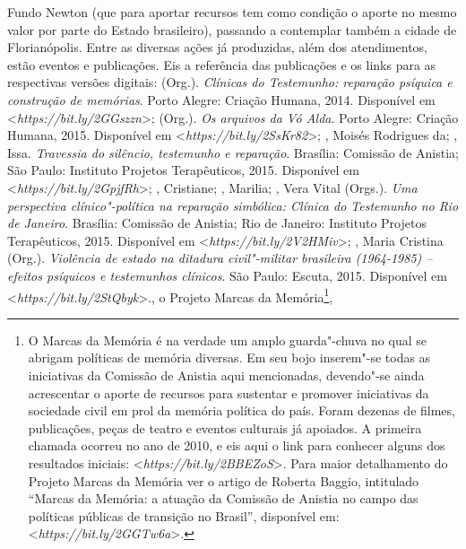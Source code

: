 {  Fundo Newton (que para aportar recursos tem como condição o aporte no
  mesmo valor por parte do Estado brasileiro), passando a contemplar
  também a cidade de Florianópolis. Entre as diversas ações já
  produzidas, além dos atendimentos, estão eventos e publicações. Eis a
  referência das publicações e os links para as respectivas versões
  digitais:  (Org.).
  \emph{Clínicas do Testemunho: reparação psíquica e construção de
  memórias}. Porto Alegre: Criação Humana, 2014. Disponível em
  \textless{}\emph{https://bit.ly/2GGszzn}\textgreater{};
   (Org.). \emph{Os
  arquivos da Vó Alda}. Porto Alegre: Criação Humana, 2015. Disponível
  em \textless{}\emph{https://bit.ly/2SsKr82}\textgreater{}; , Moisés
  Rodrigues da; , Issa. \emph{Travessia do silêncio,
  testemunho e reparação}. Brasília: Comissão de Anistia; São Paulo:
  Instituto Projetos Terapêuticos, 2015. Disponível em
  \textless{}\emph{https://bit.ly/2GpjfRh}\textgreater{};
  , Cristiane; ,
  Marilia; , Vera Vital (Orgs.). \emph{Uma perspectiva
  clínico"-política na reparação simbólica: Clínica do Testemunho no Rio
  de Janeiro}. Brasília: Comissão de Anistia; Rio de Janeiro: Instituto
  Projetos Terapêuticos, 2015. Disponível em
  \textless{}\emph{https://bit.ly/2V2HMiv}\textgreater{};
  , Maria Cristina (Org.).
  \emph{Violência de estado na ditadura civil"-militar brasileira
  (1964-1985) -- efeitos psíquicos e testemunhos clínicos}. São Paulo:
  Escuta, 2015. Disponível em \textless{}\emph{https://bit.ly/2StQbyk}\textgreater{}.},
  o Projeto Marcas da Memória\footnote{O
  Marcas da Memória é na verdade um amplo guarda"-chuva no qual se
  abrigam políticas de memória diversas. Em seu bojo inserem"-se todas as
  iniciativas da Comissão de Anistia aqui mencionadas, devendo"-se ainda
  acrescentar o aporte de recursos para sustentar e promover iniciativas
  da sociedade civil em prol da memória política do país. Foram dezenas
  de filmes, publicações, peças de teatro e eventos culturais já
  apoiados. A primeira chamada ocorreu no ano de 2010, e eis aqui o
  link para conhecer alguns dos resultados iniciais:
  \textless{}\emph{https://bit.ly/2BBEZoS}\textgreater{}.
  Para maior detalhamento do Projeto Marcas da Memória ver o artigo de
  Roberta Baggio, intitulado ``Marcas da Memória: a atuação da Comissão
      de Anistia no campo das políticas públicas de transição no Brasil'',
  disponível em: \textless{}\emph{https://bit.ly/2GGTw6a}\textgreater{}.},
